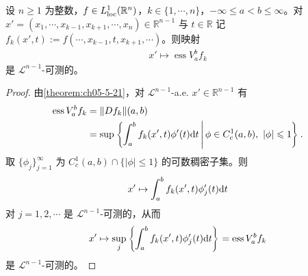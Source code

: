 \documentclass[../../main.tex]{subfiles}%
\begin{document}
\begin{lemma}\label{lemma:ch05-5-7}
设 $n\geqslant1$ 为整数，$f\in L^1_{\mathrm{loc}}(\mathbb{R}^n)$，$k\in\{1,\cdots,n\}$，$-\infty\leqslant a<b\leqslant\infty$。对 $x'=(x_1,\cdots,x_{k-1},x_{k+1},\cdots,x_n)\in\mathbb{R}^{n-1}$ 与 $t\in\mathbb{R}$ 记 $f_k(x',t):=f(\cdots,x_{k-1},t,x_{k+1},\cdots)$。则映射
\begin{align*}
x'\mapsto\operatorname{ess}V_a^b f_k
\end{align*}
是 $\mathcal{L}^{n-1}$-可测的。
\end{lemma}

\begin{proof}
由\cref{theorem:ch05-5-21}，对 $\mathcal{L}^{n-1}$-a.e. $x'\in\mathbb{R}^{n-1}$ 有 %
\begin{align*}
\operatorname{ess}V_a^b f_k&=\lVert Df_k\rVert(a,b)\\
&=\sup\left\{\int_a^b f_k(x',t)\phi'(t)\mathrm{d} t\,\middle|\,\phi\in C_c^1(a,b),\ \lvert\phi\rvert\leqslant1\right\}.
\end{align*}
取 $\{\phi_j\}_{j=1}^{\infty}$ 为 $C_c^1(a,b)\cap\{\lvert\phi\rvert\leqslant1\}$ 的可数稠密子集。则
\begin{align*}
x'\mapsto\int_a^b f_k(x',t)\phi_j'(t)\mathrm{d} t
\end{align*}
对 $j=1,2,\cdots$ 是 $\mathcal{L}^{n-1}$-可测的，从而
\begin{align*}
x'\mapsto\sup_j\left\{\int_a^b f_k(x',t)\phi_j'(t)\mathrm{d} t\right\}=\operatorname{ess}V_a^b f_k
\end{align*}
是 $\mathcal{L}^{n-1}$-可测的。
\end{proof}
\end{document}
